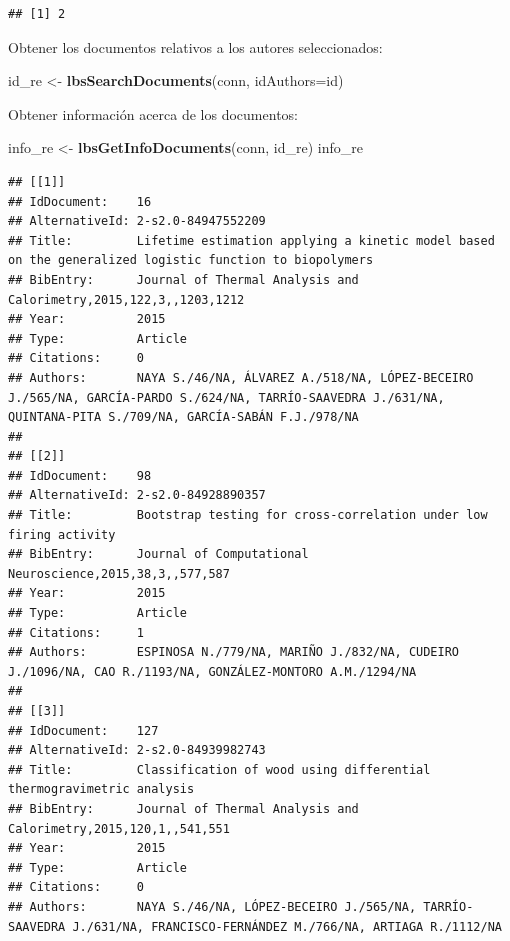 \documentclass[]{book}
\newenvironment{Shaded}{\begin{snugshade}}{\end{snugshade}}
\newcommand{\DataTypeTok}[1]{\textcolor[rgb]{0.13,0.29,0.53}{#1}}
\newcommand{\KeywordTok}[1]{\textcolor[rgb]{0.13,0.29,0.53}{\textbf{#1}}}
\newcommand{\NormalTok}[1]{#1}
\newcommand{\StringTok}[1]{\textcolor[rgb]{0.31,0.60,0.02}{#1}}
\begin{document}
\begin{verbatim}
## [1] 2
\end{verbatim}

Obtener los documentos relativos a los autores seleccionados:

\begin{Shaded}
\begin{Highlighting}[]
\NormalTok{id_re  <-}\StringTok{  }\KeywordTok{lbsSearchDocuments}\NormalTok{(conn, }\DataTypeTok{idAuthors=}\NormalTok{id)}
\end{Highlighting}
\end{Shaded}

Obtener información acerca de los documentos:

\begin{Shaded}
\begin{Highlighting}[]
\NormalTok{info_re <-}\StringTok{ }\KeywordTok{lbsGetInfoDocuments}\NormalTok{(conn, id_re)}
\NormalTok{info_re}
\end{Highlighting}
\end{Shaded}

\begin{verbatim}
## [[1]]
## IdDocument:    16
## AlternativeId: 2-s2.0-84947552209
## Title:         Lifetime estimation applying a kinetic model based on the generalized logistic function to biopolymers
## BibEntry:      Journal of Thermal Analysis and Calorimetry,2015,122,3,,1203,1212
## Year:          2015
## Type:          Article
## Citations:     0
## Authors:       NAYA S./46/NA, ÁLVAREZ A./518/NA, LÓPEZ-BECEIRO J./565/NA, GARCÍA-PARDO S./624/NA, TARRÍO-SAAVEDRA J./631/NA, QUINTANA-PITA S./709/NA, GARCÍA-SABÁN F.J./978/NA
## 
## [[2]]
## IdDocument:    98
## AlternativeId: 2-s2.0-84928890357
## Title:         Bootstrap testing for cross-correlation under low firing activity
## BibEntry:      Journal of Computational Neuroscience,2015,38,3,,577,587
## Year:          2015
## Type:          Article
## Citations:     1
## Authors:       ESPINOSA N./779/NA, MARIÑO J./832/NA, CUDEIRO J./1096/NA, CAO R./1193/NA, GONZÁLEZ-MONTORO A.M./1294/NA
## 
## [[3]]
## IdDocument:    127
## AlternativeId: 2-s2.0-84939982743
## Title:         Classification of wood using differential thermogravimetric analysis
## BibEntry:      Journal of Thermal Analysis and Calorimetry,2015,120,1,,541,551
## Year:          2015
## Type:          Article
## Citations:     0
## Authors:       NAYA S./46/NA, LÓPEZ-BECEIRO J./565/NA, TARRÍO-SAAVEDRA J./631/NA, FRANCISCO-FERNÁNDEZ M./766/NA, ARTIAGA R./1112/NA
\end{verbatim}
\end{document}
